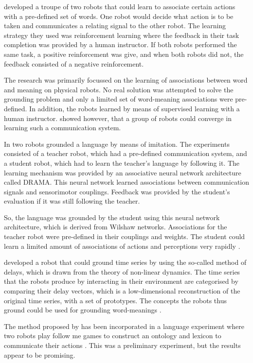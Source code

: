 \citet{yancostein} developed a troupe of two robots that could learn to associate certain actions with a pre-defined set of words. One robot would decide what action is to be taken and communicates a relating signal to the other robot. The learning strategy they used was reinforcement learning where the feedback in their task completion was provided by a human instructor. If both robots performed the same task, a positive reinforcement was give, and when both robots did not, the feedback consisted of a negative reinforcement.

The research was primarily focussed on the learning of associations between word and meaning on physical robots. No real solution was attempted to solve the grounding problem and only a limited set of word-meaning associations were pre-defined. In addition, the robots learned by means of supervised learning with a human instructor. \citet{yancostein} showed however, that a group of robots could converge in learning such a communication system.


In \citet{billard:1997a} two robots grounded a language by means of imitation. The experiments consisted of a teacher robot, which had a pre-defined communication system, and a student robot, which had to learn the teacher's language by following it. The learning mechanism was provided by an associative neural network architecture called DRAMA. This neural network learned associations between communication signals and sensorimotor couplings. Feedback was provided by the student's evaluation if it was still following the teacher.

So, the language was grounded by the student using this neural network architecture, which is derived from Wilshaw networks. Associations for the teacher robot were pre-defined in their couplings and weights. The student could learn a limited amount of associations of actions and perceptions very rapidly \citep{billard:1998}.


\citet{rosenstein:1998a} developed a robot that could ground time series by using the so-called method of delays, which is drawn from the theory of non-linear dynamics. The time series that the robots produce by interacting in their environment are categorised by comparing their delay vectors, which is a low-dimensional reconstruction of the original time series, with a set of prototypes. The concepts the robots thus ground could be used for grounding word-meanings \citep{rosenstein:1998b}.

The method proposed by \citet{rosenstein:1998a} has been incorporated in a language experiment where two robots play follow me games to construct an ontology and lexicon to communicate their actions \citep{vogt:1999a,vogt:2000}. This was a preliminary experiment, but the results appear to be promising.

